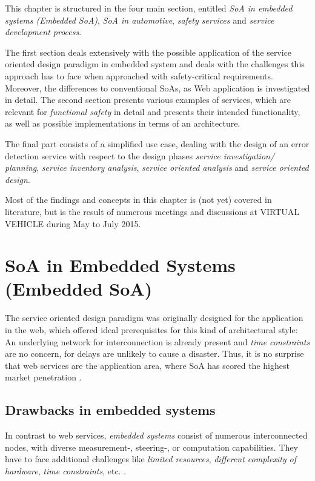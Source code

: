 \label{ch:methods}

This chapter is structured in the four main section, entitled \emph{SoA in embedded systems (Embedded SoA)}, \emph{SoA in automotive}, \emph{safety services} and \emph{service development process}. 

The first section deals extensively with the possible application of the service oriented design paradigm in embedded system and deals with the challenges this approach has to face when approached with safety-critical requirements. Moreover, the differences to conventional SoAs, as Web application is investigated in detail. 
The second section presents various examples of services, which are relevant for \emph{functional safety} in detail and presents their intended functionality, as well as possible implementations in terms of an architecture.

The final part consists of a simplified use case, dealing with the design of an error detection service with respect to the design phases \emph{service investigation/ planning}, \emph{service inventory analysis}, \emph{service oriented analysis} and \emph{service oriented design}.

Most of the findings and concepts in this chapter is (not yet) covered in literature, but is the result of numerous meetings and discussions at VIRTUAL VEHICLE during May to July 2015.









\section{SoA in Embedded Systems (Embedded SoA)}

The service oriented design paradigm was originally designed for the application in the web, which offered ideal prerequisites for this kind of architectural style: An underlying network for interconnection is already present and \emph{time constraints} are no concern, for delays are unlikely to cause a disaster. Thus, it is no surprise that web services are the application area, where SoA has scored the highest market penetration \cite{rodrigues2011} \cite{buckl}.


\subsection{Drawbacks in embedded systems}
In contrast to web services, \emph{embedded systems} consist of numerous interconnected nodes, with diverse measurement-, steering-, or computation capabilities. They have to face additional challenges like \emph{limited resources}, \emph{different complexity of hardware}, \emph{time constraints}, etc. \cite{scholz} \cite{sommer}. 

